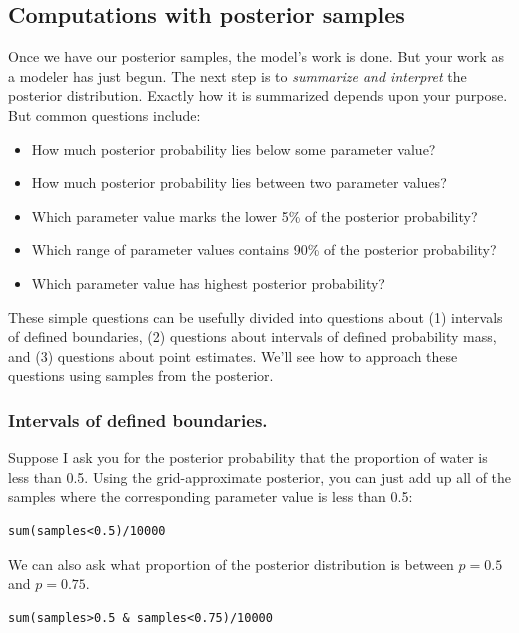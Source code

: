 \documentclass[11pt]{article}
\begin{document}
\subsection*{Computations with posterior samples}
\label{sec-2-3}

Once we have our posterior samples, the model's work is done.  But your work as a modeler has just begun.  The next step is to \emph{summarize and interpret} the posterior distribution. Exactly how it is summarized depends upon your purpose. But common questions include:

\begin{itemize}
\item How much posterior probability lies below some parameter value?
\item How much posterior probability lies between two parameter values?
\item Which parameter value marks the lower 5\% of the posterior probability?
\item Which range of parameter values contains 90\% of the posterior probability?
\item Which parameter value has highest posterior probability?
\end{itemize}

These simple questions can be usefully divided into questions about (1) intervals of defined boundaries, (2) questions about intervals of defined probability mass, and (3) questions about point estimates. We'll see how to approach these questions using samples from the posterior.

\subsubsection*{Intervals of defined boundaries.}
\label{sec-2-3-1}

Suppose I ask you for the posterior probability that the proportion of water is less than 0.5. Using the grid-approximate posterior, you can just add up all of the samples where the corresponding parameter value is less than 0.5:

\begin{verbatim}
sum(samples<0.5)/10000
\end{verbatim}

We can also ask what proportion of the posterior distribution is between $p=0.5$ and $p=0.75$.

\begin{verbatim}
sum(samples>0.5 & samples<0.75)/10000
\end{verbatim}
\end{document}
